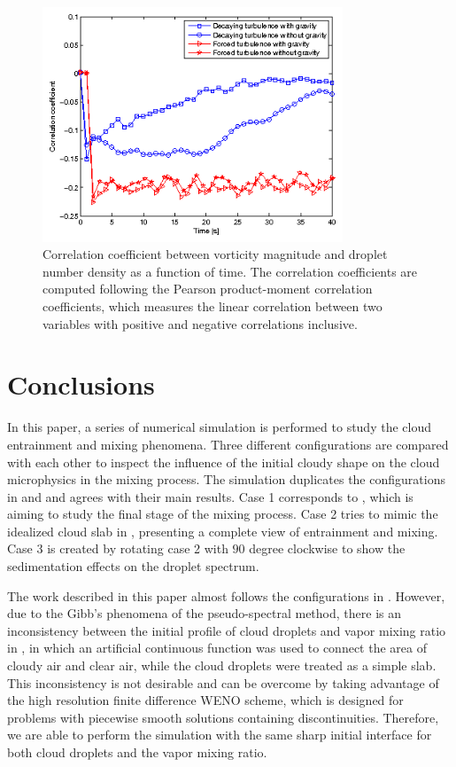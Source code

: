 \documentclass[draft,jgrga]{AGUTeX}
\begin{document}
\begin{article}
\begin{figure}\centering
\includegraphics[width=0.8\textwidth]{Figures/correlation}
\caption{Correlation coefficient between vorticity magnitude and droplet number density as a function of time. The correlation coefficients are computed following the Pearson product-moment correlation coefficients, which measures the linear correlation between two variables with positive and negative correlations inclusive.\label{fig:correlation}}
\end{figure}

\section{Conclusions}\label{conclusion}
In this paper, a series of numerical simulation is performed to study the cloud entrainment and mixing phenomena. Three different configurations are compared with each other to inspect the influence of the initial cloudy shape on the cloud microphysics in the mixing process. The simulation duplicates the configurations in \cite{And04} and \cite{Kumar11} and agrees with their main results. Case 1 corresponds to \cite{And04}, which is aiming to study the final stage of the mixing process. Case 2 tries to mimic the idealized cloud slab in \cite{Kumar11}, presenting a complete view of entrainment and mixing. Case 3 is created by rotating case 2 with $90$ degree clockwise to show the sedimentation effects on the droplet spectrum.

The work described in this paper almost follows the configurations in \cite{Kumar11}. However, due to the Gibb's phenomena of the pseudo-spectral method, there is an inconsistency between the initial profile of cloud droplets and vapor mixing ratio in \cite{Kumar11}, in which an artificial continuous function was used to connect the area of cloudy air and clear air, while the cloud droplets were treated as a simple slab. This inconsistency is not desirable and can be overcome by taking advantage of the high resolution finite difference WENO scheme, which is designed for problems with piecewise smooth solutions containing discontinuities. Therefore, we are able to perform the simulation with the same sharp initial interface for both cloud droplets and the vapor mixing ratio.


\end{article}
\end{document}
